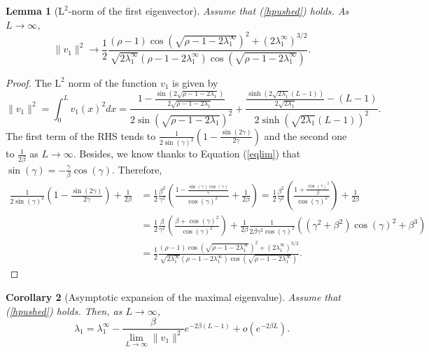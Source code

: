 \documentclass[11pt]{article}
\theoremstyle{plain}
\newtheorem{lemma}{Lemma}[section]
\newtheorem{cor}[lemma]{Corollary}
\newcommand\linf{\lambda_1^\infty}
\begin{document}
\begin{lemma}[$\mathrm{L}^2$-norm of the first eigenvector] \label{lem:l2norm}  Assume that (\ref{hpushed}) holds. As $L\to\infty$, 
\begin{equation*}
\|v_1\|^2\rightarrow \frac{1}{2}\frac{(\rho-1)\cos(\sqrt{\rho-1-2\linf})^2+(2\linf)^{3/2}}{\sqrt {2\linf}(\rho-1-2\linf)\cos(\sqrt{\rho-1-2\linf})}.
\end{equation*}
\end{lemma}
\begin{proof}
The $\mathrm{L}^2$ norm of the function $v_1$ is given by
\begin{equation*}
\|v_1\|^2=\int_0^Lv_1(x)^2dx=\frac{1-\frac{\sin(2\sqrt{\rho-1-2\lambda_1})}{2\sqrt{\rho-1-2\lambda_1}}}{2\sin(\sqrt{\rho-1-2\lambda_1})^2}+\frac{\frac{\sinh(2\sqrt{2\lambda_1}(L-1))}{2\sqrt{2\lambda_1}}-(L-1)}{2\sinh(\sqrt{2\lambda_1}(L-1))^2}. 
\end{equation*}
The first term of the RHS tends to $\frac{1}{2\sin(\gamma)^2}\left(1-\frac{\sin(2\gamma)}{2\gamma}\right)$ and the second one to $\frac{1}{2\beta}$ as $L\to\infty$. Besides, we know thanks to Equation (\ref{eqlim}) that  $\sin(\gamma)=-\frac{\gamma}{\beta}\cos(\gamma)$. Therefore,
\begin{align*}
\frac{1}{2\sin(\gamma)^2}\left(1-\frac{\sin(2\gamma)}{2\gamma}\right)+\frac{1}{2\beta}&=\frac{1}{2}\frac{\beta^2}{\gamma^2}\left(\frac{1-\frac{\sin(\gamma)\cos(\gamma)}{\gamma}}{\cos(\gamma)^2}+\frac{1}{2\beta}\right)=\frac{1}{2}\frac{\beta^2}{\gamma^2}\left(\frac{1+\frac{\cos(\gamma)^2}{\beta}}{\cos(\gamma)^2}\right)+\frac{1}{2\beta}\\
&= \frac{1}{2}\frac{\beta}{\gamma^2}\left(\frac{\beta+\cos(\gamma)^2}{\cos(\gamma)^2}\right)+\frac{1}{2\beta}\frac{1}{2\beta\gamma^2\cos(\gamma)^2}\left((\gamma^2+\beta^2)\cos(\gamma)^2+\beta^3\right)\\
&=\frac{1}{2}\frac{(\rho-1)\cos(\sqrt{\rho-1-2\linf})^2+(2\linf)^{3/2}}{\sqrt {2\linf}(\rho-1-2\linf)\cos(\sqrt{\rho-1-2\linf})}.
\end{align*}
\end{proof}
\begin{cor}[Asymptotic expansion of the maximal eigenvalue] \label{exp:lambda1}  Assume that (\ref{hpushed}) holds. Then, as $L\to \infty$,
\begin{equation}
\lambda_1=\linf-\frac{\beta}{\lim\limits_{L\rightarrow\infty}\|v_1\|^2}e^{-2\beta(L-1)}+o(e^{-2\beta L}).
\end{equation}

\end{cor}
\end{document}
